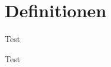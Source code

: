 	\section[Section]{Definitionen}
		\begin{defe}
			Test
		\end{defe}
		\begin{definition}
			Test
		\end{definition}